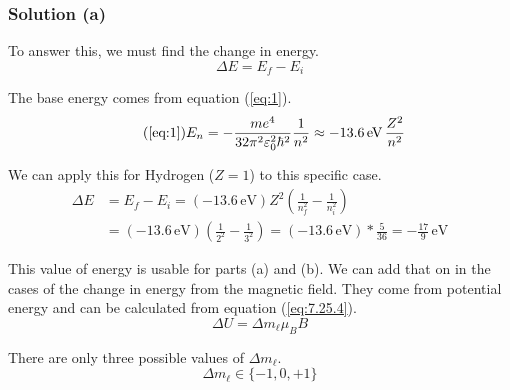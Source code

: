 \documentclass[12pt]{article}
\begin{document}
            \subsubsection{Solution (a)}
                To answer this, we must find the change in energy.
                \begin{equation}
                    \Delta E = E_f - E_i
                \end{equation}

                The base energy comes from equation (\ref{eq:1}).
                \begin{equation}
                    \tag{\ref{eq:1}}
                    E_n = -\frac{me^4}{32\pi^2 \varepsilon_0^2 \hbar^2} \frac{1}{n^2}
                        \approx -13.6\,\unit{\eV}\,\frac{Z^2}{n^2}
                \end{equation}

                We can apply this for Hydrogen ($Z = 1$) to this specific case.
                \begin{align}
                    \Delta E    &=  E_f - E_i
                        =   (-13.6\,\unit{\eV}) Z^2 \left( \frac{1}{n_f^2} - \frac{1}{n_i^2} \right)\\
                        &=  (-13.6\,\unit{\eV}) \left( \frac{1}{2^2} - \frac{1}{3^2} \right)
                        =   (-13.6\,\unit{\eV}) * \frac{5}{36}
                        =   -\frac{17}{9}\,\unit{\eV}
                \end{align}

                This value of energy is usable for parts (a) and (b).
                We can add that on in the cases of the change in energy from the magnetic field.
                They come from potential energy and can be calculated from equation (\ref{eq:7.25.4}).
                \begin{equation}
                    \label{eq:7.25.4}
                    \Delta U = \Delta m_\ell \mu_B B
                \end{equation}

                There are only three possible values of $\Delta m_\ell$.
                \begin{equation}
                    \Delta m_\ell \in \{ -1, 0, +1 \}
                \end{equation}
\end{document}
